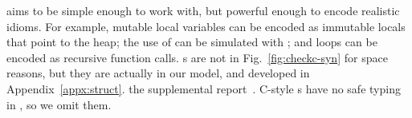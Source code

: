 \lang aims to be simple enough to work with, but powerful enough to
encode realistic \systemname idioms. For example, mutable local
variables can be encoded as immutable locals that point to the heap;
the use of \code{&} can be simulated with ;
and loops can be encoded as recursive function calls. s are
not in Fig.~\ref{fig:checkc-syn} for space reasons, but they are
actually in our model, and developed in
\iftr
Appendix~\ref{appx:struct}.
\else
the supplemental report~\cite{checkedc-tech-report}.
\fi
C-style s have no safe typing
in \checkedc, so we omit them.



